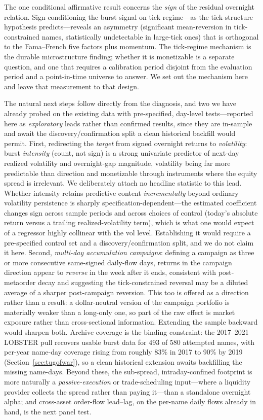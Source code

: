 \documentclass[11pt]{article}
\begin{document}
The one conditional affirmative result concerns the \emph{sign} of the residual overnight relation. Sign-conditioning the burst signal on tick regime---as the tick-structure hypothesis predicts---reveals an asymmetry (significant mean-reversion in tick-constrained names, statistically undetectable in large-tick ones) that is orthogonal to the Fama--French five factors plus momentum. The tick-regime mechanism is the durable microstructure finding; whether it is monetizable is a separate question, and one that requires a calibration period disjoint from the evaluation period and a point-in-time universe to answer. We set out the mechanism here and leave that measurement to that design.

The natural next steps follow directly from the diagnosis, and two we have already probed on the existing data with pre-specified, day-level tests---reported here as \emph{exploratory} leads rather than confirmed results, since they are in-sample and await the discovery/confirmation split a clean historical backfill would permit. First, redirecting the \emph{target} from signed overnight returns to \emph{volatility}: burst \emph{intensity} (count, not sign) is a strong univariate predictor of next-day realized volatility and overnight-gap magnitude, volatility being far more predictable than direction and monetizable through instruments where the equity spread is irrelevant. We deliberately attach no headline statistic to this lead. Whether intensity retains predictive content \emph{incrementally} beyond ordinary volatility persistence is sharply specification-dependent---the estimated coefficient changes sign across sample periods and across choices of control (today's absolute return versus a trailing realized-volatility term), which is what one would expect of a regressor highly collinear with the vol level. Establishing it would require a pre-specified control set and a discovery/confirmation split, and we do not claim it here. Second, \emph{multi-day accumulation campaigns}: defining a campaign as three or more consecutive same-signed daily-flow days, returns in the campaign direction appear to \emph{reverse} in the week after it ends, consistent with post-metaorder decay \citep{bucci2019} and suggesting the tick-constrained reversal may be a diluted average of a sharper post-campaign reversion. This too is offered as a direction rather than a result: a dollar-neutral version of the campaign portfolio is materially weaker than a long-only one, so part of the raw effect is market exposure rather than cross-sectional information. Extending the sample backward would sharpen both. Archive coverage is the binding constraint: the 2017--2021 LOBSTER pull recovers usable burst data for 493 of 580 attempted names, with per-year name-day coverage rising from roughly 83\% in 2017 to 90\% by 2019 (Section~\ref{sec:tugofwar}), so a clean historical extension awaits backfilling the missing name-days. Beyond these, the sub-spread, intraday-confined footprint is more naturally a \emph{passive-execution} or trade-scheduling input---where a liquidity provider collects the spread rather than paying it---than a standalone overnight alpha; and cross-asset order-flow lead--lag, on the per-name daily flows already in hand, is the next panel test.
\end{document}
